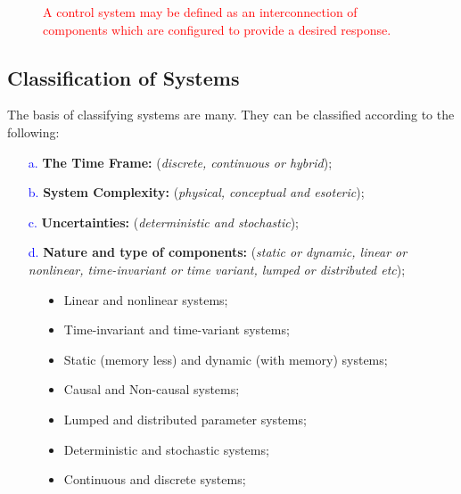 \documentclass[../notes-main.tex]{subfiles}
\begin{document}
\vspace{-1em}
\begin{figure}[H]
    \centering
    \begin{mdframed}
        \begin{center}
            \textcolor{red}{%
                A control system may be defined as an interconnection of components which are configured to provide a desired response.}
        \end{center}
    \end{mdframed}\label{fig:system-interconnect-def-1}
    \vspace{-1em}
\end{figure}
\subsection{Classification of Systems}
The basis of classifying systems are many. They can be classified according to the following:
\begin{itemize}
    \item[\textcolor{blue}{a.}] \textbf{The Time Frame:} (\emph{discrete, continuous or hybrid});
    \item[\textcolor{blue}{b.}] \textbf{System Complexity:} (\emph{physical, conceptual and esoteric});
    \item[\textcolor{blue}{c.}] \textbf{Uncertainties:} (\emph{deterministic and stochastic});
    \item[\textcolor{blue}{d.}] \textbf{Nature and type of components:} (\emph{static or dynamic, linear or nonlinear, time-invariant or time variant, lumped or distributed etc});
\end{itemize}
\begin{figure}[H]
    \centering
    \begin{mdframed}
        \begin{itemize}
            \item Linear and nonlinear systems;
            \item Time-invariant and time-variant systems;
            \item Static (memory less) and dynamic (with memory) systems;
            \item Causal and Non-causal systems;
            \item Lumped and distributed parameter systems;
            \item Deterministic and stochastic systems;
            \item Continuous and discrete systems;
        \end{itemize}
    \end{mdframed}\label{fig:system-type-list-1}
    \vspace{-1em}
\end{figure}
\vspace{-1em}
\end{document}
